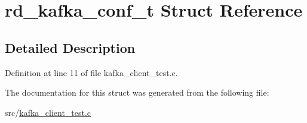 \hypertarget{structrd__kafka__conf__t}{\section{rd\-\_\-kafka\-\_\-conf\-\_\-t \-Struct \-Reference}
\label{structrd__kafka__conf__t}
}


\subsection{\-Detailed \-Description}


\-Definition at line 11 of file kafka\-\_\-client\-\_\-test.\-c.



\-The documentation for this struct was generated from the following file\-:\begin{DoxyCompactItemize}
\item 
src/\hyperlink{kafka__client__test_8c}{kafka\-\_\-client\-\_\-test.\-c}\end{DoxyCompactItemize}
